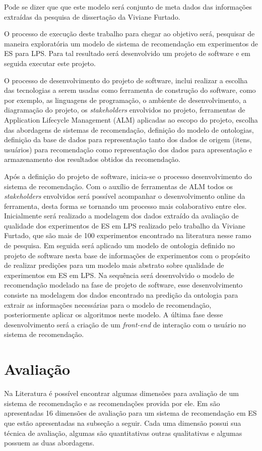 Pode se dizer que que este modelo será conjunto de meta dados das informações extraídas da pesquisa de dissertação da Viviane Furtado.

O processo de execução deste trabalho para chegar ao objetivo será, pesquisar de maneira exploratória um modelo de sistema de recomendação em experimentos de ES para LPS. Para tal resultado será desenvolvido um projeto de software e em seguida executar este projeto.

O processo de desenvolvimento do projeto de software, inclui realizar a escolha das tecnologias a serem usadas como ferramenta de construção do software, como por exemplo, as linguagens de programação, o ambiente de desenvolvimento, a diagramação do projeto, os \textit{stakeholders} envolvidos no projeto, ferramentas de Application Lifecycle Management (ALM) aplicadas ao escopo do projeto, escolha das abordagens de sistemas de recomendação, definição do modelo de ontologias, definição da base de dados para representação tanto dos dados de origem (itens, usuários) para recomendação como representação dos dados para apresentação e armazenamento dos resultados obtidos da recomendação. 

Após a definição do projeto de software, inicia-se o processo desenvolvimento do sistema de recomendação. Com o auxílio de ferramentas de ALM todos os \textit{stakeholders} envolvidos será possível acompanhar o desenvolvimento online da ferramenta, desta forma se tornando um processo mais colaborativo entre eles. 
Inicialmente será realizado a modelagem dos dados extraído da avaliação de qualidade dos experimentos de ES em LPS realizado pelo trabalho da Viviane Furtado, que são mais de 100 experimentos encontrado na literatura nesse ramo de pesquisa. Em seguida será aplicado um modelo de ontologia definido no projeto de software nesta base de informações de experimentos com o propósito de realizar predições para um modelo mais abstrato sobre qualidade de experimentos em ES em LPS. Na sequência será desenvolvido o modelo de recomendação modelado na fase de projeto de software, esse desenvolvimento consiste na modelagem dos dados encontrado na predição da ontologia para extrair as informações necessárias para o modelo de recomendação, posteriormente aplicar os algoritmos neste modelo. A última fase desse desenvolvimento será a criação de um \textit{front-end} de interação com o usuário no sistema de recomendação.


\section{Avaliação}
\label{sec:aval}
Na Literatura é possível encontrar algumas dimensões para avaliação de um sistema de recomendação e as recomendações provida por ele. Em \cite{robillard2010recommendation} são apresentadas 16 dimensões de avaliação para um sistema de recomendação em ES que estão apresentadas na subseção a seguir. Cada uma dimensão possui sua técnica de avaliação, algumas são quantitativas outras qualitativas e algumas possuem as duas abordagens.

